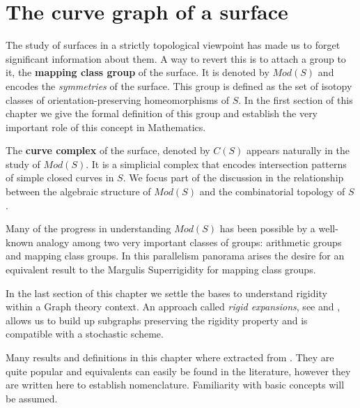 
\chapter{The curve graph of a surface} %

\label{Chapter1} %



The study of surfaces in a strictly topological viewpoint has made us to forget significant information about them. A way to revert this is to attach a group to it, the \textbf{mapping class group} of the surface. It is denoted by $Mod(S)$ and encodes the \textit{symmetries} of the surface. This group is defined as the set of isotopy classes of orientation-preserving homeomorphisms of $S$. In the first section of this chapter we give the formal definition of this group and establish the very important role of this concept in Mathematics. 

The \textbf{curve complex} of the surface, denoted by $C(S)$ appears naturally in the study of $Mod(S)$. It is a simplicial complex that encodes intersection patterns of simple closed curves in $S$. We focus part of the discussion in the relationship between the algebraic structure of $Mod(S)$ and the combinatorial topology of $S$.

Many of the progress in understanding $Mod(S)$ has been possible by a well-known analogy among two very important classes of groups: arithmetic groups and mapping class groups. In this parallelism panorama arises the desire for an equivalent result to the Margulis Superrigidity for mapping class groups.

In the last section of this chapter we settle the bases to understand rigidity within a Graph theory context. An approach called \textit{rigid expansions}, see \cite[Aramayona, Leininger 16]{finiteRigidSetsJA} and \cite[Hernandez 19]{exhaustionCurveGraph}, allows us to build up subgraphs preserving the rigidity property and is compatible with a stochastic scheme.
 
Many results and definitions in this chapter where extracted from \cite[Farb]{Farb}. They are quite popular and equivalents can easily be found in the literature, however they are written here to establish nomenclature. Familiarity with basic concepts will be assumed.

